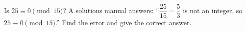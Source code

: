 Is $25\equiv0\pmod{15}$? A solutions manual answers: ``$\dfrac{25}{15}=\dfrac53$ is not an integer, so $25\equiv0\pmod{15}$.'' Find the error and give the correct answer.
